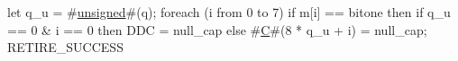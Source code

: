 let q_u = #\hyperref[sailRISCVzunsigned]{unsigned}#(q);
foreach (i from 0 to 7)
  if m[i] == bitone then
    if q_u == 0 & i == 0 then
      DDC = null_cap
    else
      #\hyperref[sailRISCVzC]{C}#(8 * q_u + i) = null_cap;
RETIRE_SUCCESS
